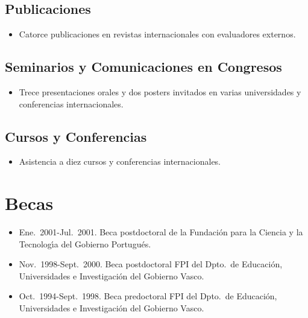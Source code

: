 \documentclass{article}
\begin{document}

\subsection*{Publicaciones}

\begin{itemize}\itemsep 0pt
\item Catorce publicaciones en revistas internacionales con evaluadores externos.
\end{itemize}


\subsection*{Seminarios y Comunicaciones en Congresos}

\begin{itemize}\itemsep 0pt
\item Trece presentaciones orales y dos posters invitados en varias 
universidades y conferencias internacionales.
\end{itemize}


\subsection*{Cursos y Conferencias}

\begin{itemize}\itemsep 0pt
\item Asistencia a diez cursos y conferencias internacionales.
\end{itemize}



\section*{Becas}

\begin{itemize}\itemsep 0pt
\item Ene.~2001-Jul.~2001.
Beca postdoctoral de la Fundaci\'on para la Ciencia y la 
Tecnolog\'{\i}a del Gobierno Portugu\'es.

\item Nov.~1998-Sept.~2000. 
Beca postdoctoral FPI del Dpto.\ de Educaci\'{o}n, Universidades 
e Investigaci\'{o}n del Gobierno Vasco. 

\item Oct.~1994-Sept.~1998. 
Beca predoctoral FPI del Dpto.\ de Educaci\'{o}n, Universidades 
e Investigaci\'{o}n
\linebreak
del Gobierno Vasco.
\end{itemize}
\end{document}

